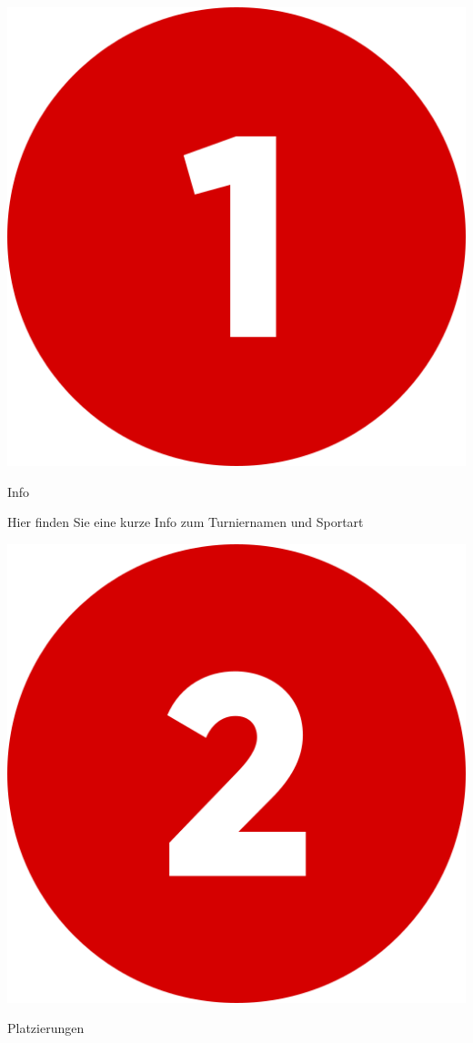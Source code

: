 \includegraphics[scale=0.05]{pics/user-guide/numbers/number-1.png} \begin{LARGE} Info \end{LARGE}

Hier finden Sie eine kurze Info zum Turniernamen und Sportart

\bigskip
\includegraphics[scale=0.05]{pics/user-guide/numbers/number-2.png} \begin{LARGE} Platzierungen \end{LARGE}

